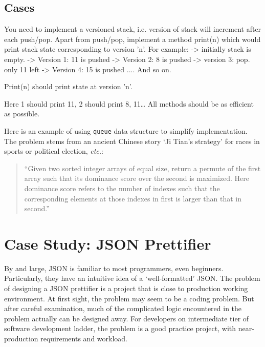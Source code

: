 \documentclass[oneside,11pt]{book}
\makeatletter
\let\LaTeXAtSign=\@
\let\@=\relax
\let\@=\LaTeXAtSign
\theoremstyle{definition}
\theoremstyle{remark}
\newcommand{\code}[1]{\mbox{\lstinline{#1}}}
\makeatother
\begin{document}
\section{Cases}

\label{Evernote:Versioned Stack algorithm}
You need to implement a versioned stack, i.e. version of stack will increment after each push/pop. Apart from push/pop, implement a method print(n) which would print stack state corresponding to version 'n'. For example:
-> initially stack is empty.
-> Version 1: 11 is pushed
-> Version 2: 8 is pushed
-> version 3: pop. only 11 left
-> Version 4: 15 is pushed
....
And so on.

Print(n) should print state at version 'n'.

Here 1 should print 11, 2 should print 8, 11\ldots
All methods should be as efficient as possible.



Here is an example of using \code{queue} data structure to simplify implementation.
The problem stems from an ancient Chinese story `Ji Tian's strategy' for races in sports or
political election,
\textit{etc.}:
\begin{quote}
    ``Given two sorted integer arrays of equal size, return a permute of the first array
    such that its dominance score over the second is maximized.
    Here dominance score refers to the number of indexes such that the corresponding elements at
    those indexes in first is larger than that in second.''
\end{quote}


\clearpage{}
    \clearpage{}

\chapter{Case Study: JSON Prettifier}\label{ch:json-prettifier}

By and large, JSON is familiar to most programmers, even beginners.
Particularly, they have an intuitive idea of a `well-formatted' JSON\@.
The problem of designing a JSON prettifier is a project that is close to production working
environment.
At first sight, the problem may seem to be a coding problem.
But after careful examination, much of the complicated logic encountered in
the problem actually can be designed away.
For developers on intermediate tier of software development ladder,
the problem is a good practice project, with near-production requirements and workload.
\end{document}
